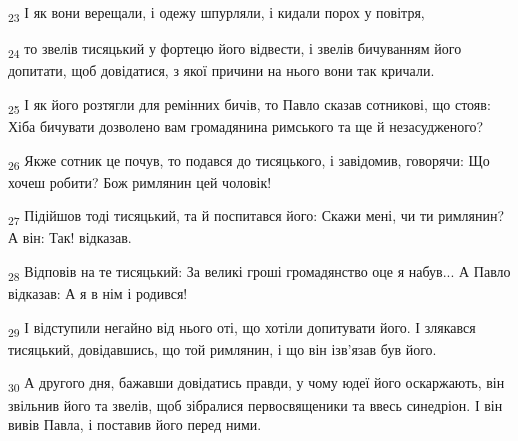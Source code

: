 \begin{tcolorbox}
\textsubscript{23} І як вони верещали, і одежу шпурляли, і кидали порох у повітря,
\end{tcolorbox}
\begin{tcolorbox}
\textsubscript{24} то звелів тисяцький у фортецю його відвести, і звелів бичуванням його допитати, щоб довідатися, з якої причини на нього вони так кричали.
\end{tcolorbox}
\begin{tcolorbox}
\textsubscript{25} І як його розтягли для ремінних бичів, то Павло сказав сотникові, що стояв: Хіба бичувати дозволено вам громадянина римського та ще й незасудженого?
\end{tcolorbox}
\begin{tcolorbox}
\textsubscript{26} Якже сотник це почув, то подався до тисяцького, і завідомив, говорячи: Що хочеш робити? Бож римлянин цей чоловік!
\end{tcolorbox}
\begin{tcolorbox}
\textsubscript{27} Підійшов тоді тисяцький, та й поспитався його: Скажи мені, чи ти римлянин? А він: Так! відказав.
\end{tcolorbox}
\begin{tcolorbox}
\textsubscript{28} Відповів на те тисяцький: За великі гроші громадянство оце я набув... А Павло відказав: А я в нім і родився!
\end{tcolorbox}
\begin{tcolorbox}
\textsubscript{29} І відступили негайно від нього оті, що хотіли допитувати його. І злякався тисяцький, довідавшись, що той римлянин, і що він ізв'язав був його.
\end{tcolorbox}
\begin{tcolorbox}
\textsubscript{30} А другого дня, бажавши довідатись правди, у чому юдеї його оскаржають, він звільнив його та звелів, щоб зібралися первосвященики та ввесь синедріон. І він вивів Павла, і поставив його перед ними.
\end{tcolorbox}
